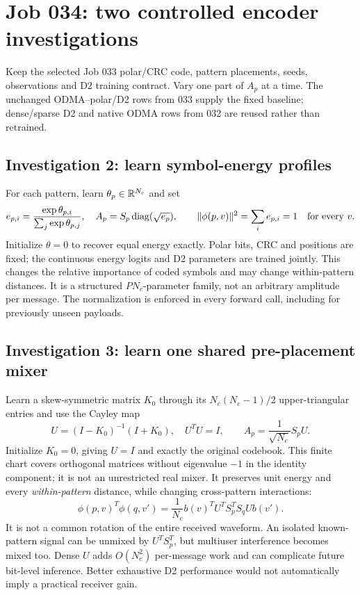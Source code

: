 \documentclass[10pt,a4paper]{article}
\begin{document}
\clearpage
\section{Job 034: two controlled encoder investigations}
Keep the selected Job 033 polar/CRC code, pattern placements, seeds, observations and D2 training contract.
Vary one part of $A_p$ at a time. The unchanged ODMA--polar/D2 rows from 033 supply the fixed baseline;
dense/sparse D2 and native ODMA rows from 032 are reused rather than retrained.

\subsection{Investigation 2: learn symbol-energy profiles}
For each pattern, learn $\theta_p\in\mathbb{R}^{N_c}$ and set
\begin{equation}
 e_{p,i}=\frac{\exp\theta_{p,i}}{\sum_j\exp\theta_{p,j}},\quad
 A_p=S_p\operatorname{diag}(\sqrt{e_p}),\qquad
 \|\phi(p,v)\|^2=\sum_i e_{p,i}=1\quad\text{for every }v.
\end{equation}
Initialize $\theta=0$ to recover equal energy exactly. Polar bits, CRC and positions are fixed; the continuous energy
logits and D2 parameters are trained jointly. This changes the relative importance of coded symbols and may change
within-pattern distances. It is a structured $P N_c$-parameter family, not an arbitrary amplitude per message.
The normalization is enforced in every forward call, including for previously unseen payloads.

\subsection{Investigation 3: learn one shared pre-placement mixer}
Learn a skew-symmetric matrix $K_0$ through its $N_c(N_c-1)/2$ upper-triangular entries and use the Cayley map
\begin{equation}
 U=(I-K_0)^{-1}(I+K_0),\quad U^TU=I,\qquad
 A_p=\frac1{\sqrt{N_c}}S_p U.
\end{equation}
Initialize $K_0=0$, giving $U=I$ and exactly the original codebook. This finite chart covers orthogonal matrices
without eigenvalue $-1$ in the identity component; it is not an unrestricted real mixer.
It preserves unit energy and every \emph{within-pattern} distance, while changing cross-pattern interactions:
\begin{equation}
 \phi(p,v)^T\phi(q,v')=\frac1{N_c}b(v)^T U^T S_p^T S_q U b(v').
\end{equation}
It is not a common rotation of the entire received waveform. An isolated known-pattern signal can be unmixed by
$U^T S_p^T$, but multiuser interference becomes mixed too. Dense $U$ adds $O(N_c^2)$ per-message work and can complicate
future bit-level inference. Better exhaustive D2 performance would not automatically imply a practical receiver gain.
\end{document}
